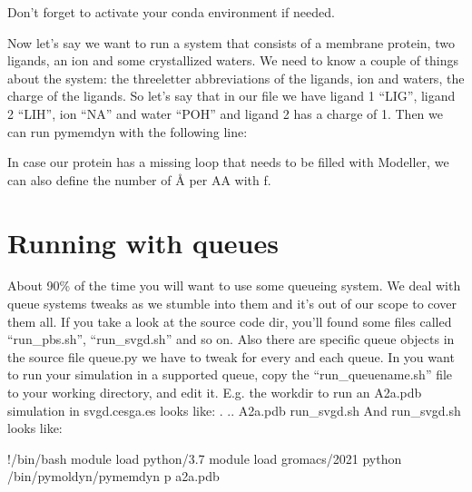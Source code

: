 \documentclass[letterpaper,10pt,english]{sphinxmanual}
\begin{document}
\sphinxAtStartPar
Don’t forget to activate your conda environment if needed.

\sphinxAtStartPar
Now let’s say we want to run a system that consists of a membrane protein, two
ligands, an ion and some crystallized waters. We need to know a couple of
things about the system: the three\sphinxhyphen{}letter abbreviations of the ligands, ion
and waters, the charge of the ligands. So let’s say that in our file we have
ligand 1 “LIG”, ligand 2 “LIH”, ion “NA” and water “POH” and ligand 2 has a
charge of \sphinxhyphen{}1. Then we can run pymemdyn with the following line:

\begin{sphinxVerbatim}[commandchars=\\\{\}]
            
\end{sphinxVerbatim}

\sphinxAtStartPar
In case our protein has a missing loop that needs to be filled with Modeller,
we can also define the number of Å per AA with \sphinxhyphen{}f.


\section{Running with queues}
\label{\detokenize{manual:running-with-queues}}
\sphinxAtStartPar
About 90\% of the time you will want to use some queueing system. We
deal with queue systems tweaks as we stumble into them and it’s out of
our scope to cover them all. If you take a look at the source code dir,
you’ll found some files called “run\_pbs.sh”, “run\_svgd.sh” and so on.
Also there are specific queue objects in the source file queue.py we
have to tweak for every and each queue. In you want to run your
simulation in a supported queue, copy the “run\_queuename.sh” file to
your working directory, and edit it. E.g. the workdir to run an A2a.pdb
simulation in svgd.cesga.es looks like: . .. A2a.pdb run\_svgd.sh And
run\_svgd.sh looks like:

\begin{sphinxVerbatim}[commandchars=\\\{\}]
\PYGZbs{}\PYGZdl{}!/bin/bash
module   load  python/3.7
module   load  gromacs/2021
python \PYGZti{}/bin/pymoldyn/pymemdyn  \PYGZhy{}p  a2a.pdb
\end{sphinxVerbatim}
\end{document}
